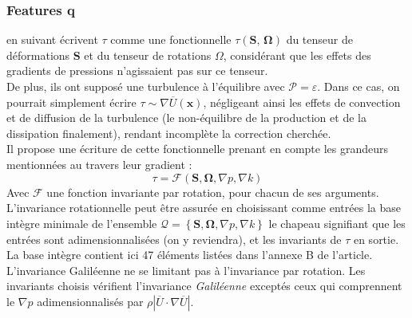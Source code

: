 \documentclass[a4paper,12pt]{report}
\newcommand{\bepar}[1]{
	\left( #1 \right)  
}
\newcommand{\beacc}[1]{
	\left\{ #1 \right \}  
}
\numberwithin{equation}{section} %
\begin{document}
\subsubsection*{Features \textbf{q}}
\noindent\cite{ling2016reynolds} en suivant \cite{pope1975more} écrivent \textbf{$\tau$} comme une fonctionnelle $\tau\bepar{\textbf{S},\, \mathbf{\Omega}}$ du tenseur de déformations \textbf{S} et du tenseur de rotations \textbf{$\Omega$}, considérant que les effets des gradients de pressions n'agissaient pas sur ce tenseur. \\
De plus, ils ont supposé une turbulence à l'équilibre avec $\mathcal{P} = \mathcal{\varepsilon}$. Dans ce cas, on pourrait simplement écrire $\tau \sim \nabla \overline{U}\bepar{\textbf{x}}$, négligeant ainsi les effets de convection et de diffusion de la turbulence (le non-équilibre de la production et de la dissipation finalement), rendant incomplète la correction cherchée.\\
Il propose une écriture de cette fonctionnelle prenant en compte les grandeurs mentionnées au travers leur gradient :$$\tau = \mathcal{F}\bepar{\textbf{S}, \mathbf{\Omega}, \nabla p, \nabla k}$$ Avec $\mathcal{F}$ une fonction invariante par rotation, pour chacun de ses arguments.\\
L'invariance rotationnelle peut être assurée en choisissant comme entrées la base intègre minimale de l'ensemble $\hat{\mathcal{Q}}  = \beacc{\textbf{S}, \mathbf{\Omega}, \nabla p, \nabla k}$ le chapeau signifiant que les entrées sont adimensionnalisées (on y reviendra), et les invariants de $\tau$ en sortie.\\
La base intègre contient ici 47 éléments listées dans l'annexe B de l'article. L'invariance Galiléenne ne se limitant pas à l'invariance par rotation. Les invariants choisis vérifient l'invariance \textit{Galiléenne} exceptés ceux qui comprennent le $\nabla p$ adimensionnalisés par $\rho \left \vert \overline{U} \cdot \nabla \overline{U} \right \vert$. \\
\end{document}
